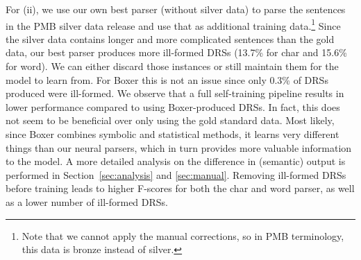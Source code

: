 \documentclass[11pt,a4paper]{article}
\begin{document}
For (ii), we use our own best parser (without silver data) to parse the sentences in the PMB silver data release and use that as additional training data.\footnote{Note that we cannot apply the manual corrections, so in PMB terminology, this data is bronze instead of silver.} Since the silver data contains longer and more complicated sentences than the gold data, our best parser produces more ill-formed DRSs (13.7\% for char and 15.6\% for word). We can either discard those instances or still maintain them for the model to learn from. For Boxer this is not an issue since only 0.3\% of DRSs produced were ill-formed. We observe that a full self-training pipeline results in lower performance compared to using Boxer-produced DRSs. In fact, this does not seem to be beneficial over only using the gold standard data. Most likely, since Boxer combines symbolic and statistical methods, it learns very different things than our neural parsers, which in turn provides more valuable information to the model. A more detailed analysis on the difference in (semantic) output is performed in Section~\ref{sec:analysis} and \ref{sec:manual}. 
Removing ill-formed DRSs before training leads to higher F-scores for both the char and word parser, as well as a lower number of ill-formed DRSs.

\begin{table}[!t]
\centering
{}
\caption{Test set results of our best neural models compared to two baseline models and two parsers.}
\label{tab:comparison}
\end{table}
\end{document}

